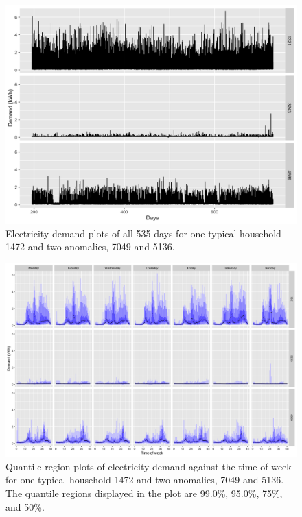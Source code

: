 \documentclass{article}
\begin{document}
\begin{figure}

{\centering \includegraphics[width=0.8\linewidth]{figures/electricity_compare3id} 

}

\caption{Electricity demand plots of all 535 days for one typical household 1472 and two anomalies, 7049 and 5136. }\label{fig:compare3ids}
\end{figure}
\begin{figure}

{\centering \includegraphics[width=1\linewidth]{figures/electricity_hdrbox_3id_7dow} 

}

\caption{Quantile region plots of electricity demand against the time of week for one typical household 1472 and two anomalies, 7049 and 5136. The quantile regions displayed in the plot are 99.0\%, 95.0\%, 75\%, and 50\%. }\label{fig:hdrboxplot3ids}
\end{figure}
\end{document}
